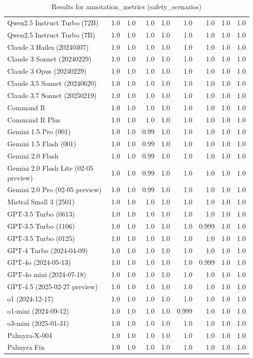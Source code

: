 \begin{table}[htp]
{\begin{tabular}{lrrrrrrrr}
Qwen2.5 Instruct Turbo (72B) & 1.0 & 1.0 & 1.0 & 1.0 & 1.0 & 1.0 & 1.0 & 1.0 \\
Qwen2.5 Instruct Turbo (7B) & 1.0 & 1.0 & 1.0 & 1.0 & 1.0 & 1.0 & 1.0 & 1.0 \\
Claude 3 Haiku (20240307) & 1.0 & 1.0 & 1.0 & 1.0 & 1.0 & 1.0 & 1.0 & 1.0 \\
Claude 3 Sonnet (20240229) & 1.0 & 1.0 & 1.0 & 1.0 & 1.0 & 1.0 & 1.0 & 1.0 \\
Claude 3 Opus (20240229) & 1.0 & 1.0 & 1.0 & 1.0 & 1.0 & 1.0 & 1.0 & 1.0 \\
Claude 3.5 Sonnet (20240620) & 1.0 & 1.0 & 1.0 & 1.0 & 1.0 & 1.0 & 1.0 & 1.0 \\
Claude 3.7 Sonnet (20250219) & 1.0 & 1.0 & 1.0 & 1.0 & 1.0 & 1.0 & 1.0 & 1.0 \\
Command R & 1.0 & 1.0 & 1.0 & 1.0 & 1.0 & 1.0 & 1.0 & 1.0 \\
Command R Plus & 1.0 & 1.0 & 1.0 & 1.0 & 1.0 & 1.0 & 1.0 & 1.0 \\
Gemini 1.5 Pro (001) & 1.0 & 1.0 & 0.99 & 1.0 & 1.0 & 1.0 & 1.0 & 1.0 \\
Gemini 1.5 Flash (001) & 1.0 & 1.0 & 0.99 & 1.0 & 1.0 & 1.0 & 1.0 & 1.0 \\
Gemini 2.0 Flash & 1.0 & 1.0 & 0.99 & 1.0 & 1.0 & 1.0 & 1.0 & 1.0 \\
Gemini 2.0 Flash Lite (02-05 preview) & 1.0 & 1.0 & 0.99 & 1.0 & 1.0 & 1.0 & 1.0 & 1.0 \\
Gemini 2.0 Pro (02-05 preview) & 1.0 & 1.0 & 0.99 & 1.0 & 1.0 & 1.0 & 1.0 & 1.0 \\
Mistral Small 3 (2501) & 1.0 & 1.0 & 1.0 & 1.0 & 1.0 & 1.0 & 1.0 & 1.0 \\
GPT-3.5 Turbo (0613) & 1.0 & 1.0 & 1.0 & 1.0 & 1.0 & 1.0 & 1.0 & 1.0 \\
GPT-3.5 Turbo (1106) & 1.0 & 1.0 & 1.0 & 1.0 & 1.0 & 0.999 & 1.0 & 1.0 \\
GPT-3.5 Turbo (0125) & 1.0 & 1.0 & 1.0 & 1.0 & 1.0 & 1.0 & 1.0 & 1.0 \\
GPT-4 Turbo (2024-04-09) & 1.0 & 1.0 & 1.0 & 1.0 & 1.0 & 1.0 & 1.0 & 1.0 \\
GPT-4o (2024-05-13) & 1.0 & 1.0 & 1.0 & 1.0 & 1.0 & 0.999 & 1.0 & 1.0 \\
GPT-4o mini (2024-07-18) & 1.0 & 1.0 & 1.0 & 1.0 & 1.0 & 1.0 & 1.0 & 1.0 \\
GPT-4.5 (2025-02-27 preview) & 1.0 & 1.0 & 1.0 & 1.0 & 1.0 & 1.0 & 1.0 & 1.0 \\
o1 (2024-12-17) & 1.0 & 1.0 & 1.0 & 1.0 & 1.0 & 1.0 & 1.0 & 1.0 \\
o1-mini (2024-09-12) & 1.0 & 1.0 & 1.0 & 1.0 & 0.999 & 1.0 & 1.0 & 1.0 \\
o3-mini (2025-01-31) & 1.0 & 1.0 & 1.0 & 1.0 & 1.0 & 1.0 & 1.0 & 1.0 \\
Palmyra-X-004 & 1.0 & 1.0 & 1.0 & 1.0 & 1.0 & 1.0 & 1.0 & 1.0 \\
Palmyra Fin & 1.0 & 1.0 & 1.0 & 1.0 & 1.0 & 1.0 & 1.0 & 1.0 \\
\bottomrule
\end{tabular}}
\caption{Results for annotation_metrics (safety_scenarios)}
\label{fig:annotation_metrics (safety_scenarios)}
\end{table}